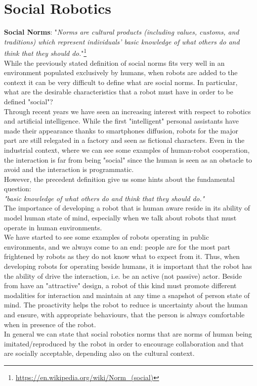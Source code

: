 \documentclass[pdftex,12pt,a4paper]{report}
\begin{document}
\section{Social Robotics}
\textbf{Social Norms}: "\textit{Norms are cultural products (including values, customs, and traditions) which represent individuals' basic knowledge of what others do and think that they should do.}"\footnote{\url{https://en.wikipedia.org/wiki/Norm_(social)}}\\
\newline
\noindent While the previously stated definition of social norms fits very well in an environment populated exclusively by humans, when robots are added to the context it can be very difficult to define what are social norms. In particular, what are the desirable characteristics that a robot must have in order to be defined "social"?\\
\noindent Through recent years we have seen an increasing interest with respect to robotics and artificial intelligence. %
While the first "intelligent" personal assistants have made their appearance thanks to smartphones diffusion, robots for the major part are still relegated in a factory and seen as fictional characters.
Even in the industrial context, where we can see some examples of human-robot cooperation, the interaction is far from being "social" since the human is seen as an obstacle to avoid and the interaction is programmatic.\\
However, the precedent definition  give us some hints about the fundamental question:\\ 
\noindent\textit{"basic knowledge of what others do and think that they should do."}\\
The importance of developing a robot that is human aware reside in its ability of model human state of mind, especially when we talk about robots that must operate in human environments.\\
We have started to see some examples of robots operating in public environments, and we always come to an end: people are for the most part frightened by robots as they do not know what to expect from it.
Thus, when developing robots for operating beside humans, it is important that the robot has the ability of  drive the interaction, i.e. be an active (not passive) actor. Beside from have an "attractive" design, a robot of this kind must promote different modalities for interaction and maintain at any time a snapshot of person state of mind. The proactivity helps the robot to reduce is uncertainty about the human and ensure, with appropriate behaviours, that the person is always comfortable when in presence of the robot.\\
In general we can state that social robotics norms that are norms of human being imitated/reproduced by the robot in order to encourage collaboration and that are socially acceptable, depending also on the cultural context.\\ 
\end{document}
